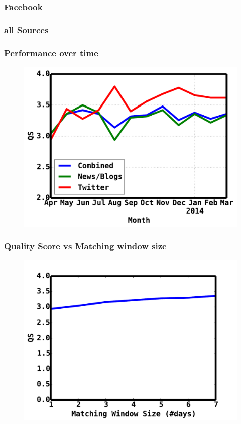\documentclass[red]{beamer}
\begin{document}
\begin{frame}
    \frametitle{Facebook}
\end{frame}

\begin{frame}
    \frametitle{all Sources}
\end{frame}
\fi
\begin{frame}
    \frametitle{Performance over time}
    \begin{figure}
        \includegraphics[scale=0.4]{monthlyqs}
    \end{figure}
\end{frame}

\begin{frame}
    \frametitle{Quality Score vs Matching window size}
    \begin{figure}
        \includegraphics[scale=0.4]{matchingwindow}
    \end{figure}
\end{frame}
\end{document}
